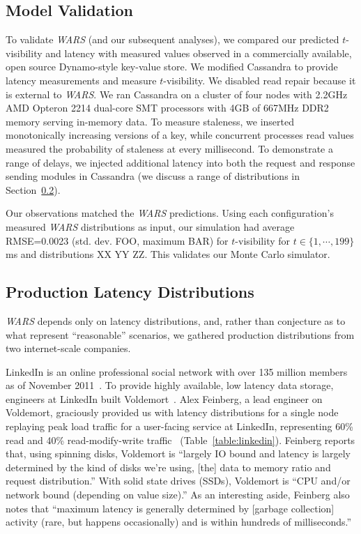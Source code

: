 \documentclass{vldb}
\newcommand{\subsectionskip}{-0em}
\begin{document}
\vspace{\subsectionskip}\subsection{Model Validation}

To validate \textit{WARS} (and our subsequent analyses), we compared
our predicted $t$-visibility and latency with measured values observed
in a commercially available, open source Dynamo-style key-value store.
We modified Cassandra to provide latency measurements and measure
$t$-visibility.  We disabled read repair because it is external to
\textit{WARS}.  We ran Cassandra on a cluster of four nodes with
2.2GHz AMD Opteron 2214 dual-core SMT processors with 4GB of 667MHz
DDR2 memory serving in-memory data.  To measure staleness, we inserted
monotonically increasing versions of a key, while concurrent processes
read values measured the probability of staleness at every
millisecond.  To demonstrate a range of delays, we injected additional
latency into both the request and response sending modules in
Cassandra (we discuss a range of distributions in
Section~\ref{sec:latencies}).

Our observations matched the \textit{WARS} predictions.  Using each
configuration's measured \textit{WARS} distributions as input, our
simulation had average RMSE=0.0023 (std. dev. FOO, maximum BAR) for
$t$-visibility for $t\in\{1,\cdots,199\}$ ms and distributions XX YY
ZZ.  This validates our Monte Carlo simulator.



\vspace{\subsectionskip}\subsection{Production Latency Distributions}
\label{sec:latencies}

\textit{WARS} depends only on latency distributions, and, rather than
conjecture as to what represent ``reasonable'' scenarios, we gathered
production distributions from two internet-scale companies.

LinkedIn is an online professional social network with over 135
million members as of November 2011~\cite{linkedin}. To provide highly
available, low latency data storage, engineers at LinkedIn built
Voldemort~\cite{voldemort, voldemortpub}.  Alex Feinberg, a lead
engineer on Voldemort, graciously provided us with latency
distributions for a single node replaying peak load traffic for a
user-facing service at LinkedIn, representing 60\% read and 40\%
read-modify-write traffic~\cite{feinbergpc}
(Table~\ref{table:linkedin}).  Feinberg reports that, using spinning
disks, Voldemort is ``largely IO bound and latency is largely
determined by the kind of disks we're using, [the] data to memory
ratio and request distribution.''  With solid state drives (SSDs),
Voldemort is ``CPU and/or network bound (depending on value size).''
As an interesting aside, Feinberg also notes that ``maximum latency is
generally determined by [garbage collection] activity (rare, but
happens occasionally) and is within hundreds of milliseconds.''
\end{document}
